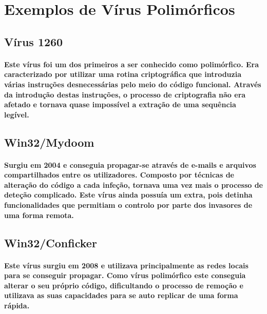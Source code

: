 \documentclass[runningheads]{llncs}
\begin{document}
\section{Exemplos de Vírus Polimórficos}

\subsection{Vírus 1260}
\paragraph{Este vírus foi um dos primeiros a ser conhecido como polimórfico. Era caracterizado por utilizar uma rotina criptográfica que introduzia várias instruções desnecessárias pelo meio do código funcional. Através da introdução destas instruções, o processo de criptografia não era afetado e tornava quase impossível a extração de uma sequência legível.}\cite{3}

\subsection{Win32/Mydoom}
\paragraph{Surgiu em 2004 e conseguia propagar-se através de e-mails e arquivos compartilhados entre os utilizadores. Composto por técnicas de alteração do código a cada infeção, tornava uma vez mais o processo de deteção complicado. Este vírus ainda possuía um extra, pois detinha funcionalidades que permitiam o controlo por parte dos invasores de uma forma remota. }\cite{3}

\subsection{Win32/Conficker}
\paragraph{Este vírus surgiu em 2008 e utilizava principalmente as redes locais para se conseguir propagar. Como vírus polimórfico este conseguia alterar o seu próprio código, dificultando o processo de remoção e utilizava as suas capacidades para se auto replicar de uma forma rápida. }\cite{3}


\end{document}
